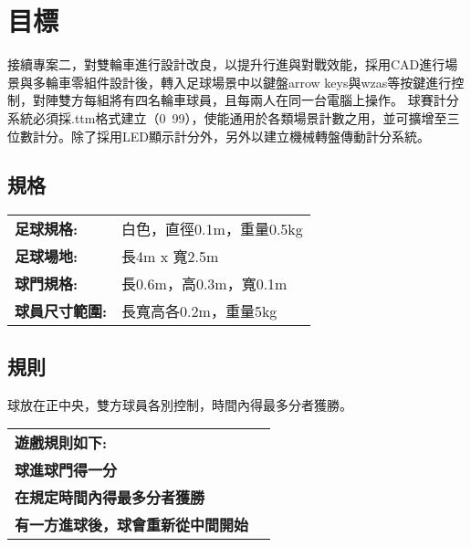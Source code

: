 \chapter{目標}
接續專案二，對雙輪車進行設計改良，以提升行進與對戰效能，採用CAD進行場景與多輪車零組件設計後，轉入足球場景中以鍵盤arrow keys與wzas等按鍵進行控制，對陣雙方每組將有四名輪車球員，且每兩人在同一台電腦上操作。
球賽計分系統必須採.ttm格式建立（0~99），使能通用於各類場景計數之用，並可擴增至三位數計分。除了採用LED顯示計分外，另外以建立機械轉盤傳動計分系統。

\section{規格}
\begin{tabular}{p{8cm}p{10cm}}
  \textbf{足球規格:} & 白色，直徑0.1m，重量0.5kg \\
  \textbf{足球場地:} & 長4m x 寬2.5m \\
  \textbf{球門規格:} & 長0.6m，高0.3m，寬0.1m \\
  \textbf{球員尺寸範圍:} & 長寬高各0.2m，重量5kg \\
\end{tabular}

\section{規則}
球放在正中央，雙方球員各別控制，時間內得最多分者獲勝。 \\
\begin{tabular}{p{8cm}p{10cm}}
  \textbf{遊戲規則如下:} \\
  \textbf{球進球門得一分} \\
  \textbf{在規定時間內得最多分者獲勝} \\
  \textbf{有一方進球後，球會重新從中間開始} \\
\end{tabular}
